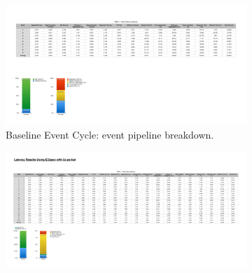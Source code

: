   \begin{figure}[ht!]
    \centering
    \begin{subfigure}{.5\textwidth}
      \centering
      \includegraphics[height=\linewidth]{./images/cloud_ecspec_effective_breakdown}
      \caption{Baseline Event Cycle: event pipeline breakdown.}
      \label{fig:ecspecf_effective_base}
      \end{subfigure}%
      \begin{subfigure}{.5\textwidth}
        \centering
        \includegraphics[height=\linewidth]{./images/cloud_ecspecf_effective_breakdown}

\end{subfigure}
\end{figure}
